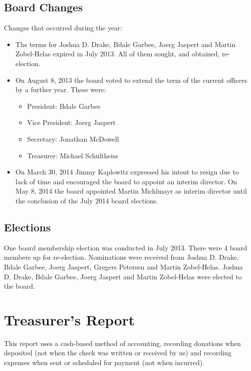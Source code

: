 \documentclass[letterpaper]{report}
\begin{document}
\section{Board Changes}

Changes that occurred during the year:

\begin{itemize}
\item The terms for Joshua D. Drake, Bdale Garbee, Joerg Jaspert and
Martin Zobel-Helas expired in July 2013. All of them sought, and
obtained, re-election.
\item On August 8, 2013 the board voted to extend the term of the current
officers by a further year. These were:
\begin{itemize}
\item President: Bdale Garbee
\item Vice President: Joerg Jaspert
\item Secretary: Jonathan McDowell
\item Treasurer: Michael Schultheiss
\end{itemize}
\item On March 30, 2014 Jimmy Kaplowitz expressed his intent to resign
due to lack of time and encouraged the board to appoint an interim
director.  On May 8, 2014 the board appointed Martin Michlmayr as
interim director until the conclusion of the July 2014 board elections.
\end{itemize}

\section{Elections}

One board membership election was conducted in July 2013. There were 4
board members up for re-election.  Nominations were received from Joshua D.
Drake, Bdale Garbee, Joerg Jaspert, Gregers Petersen and Martin
Zobel-Helas.  Joshua D. Drake, Bdale Garbee, Joerg Jaspert and Martin
Zobel-Helas were elected to the board.

\chapter{Treasurer's Report}

This report uses a cash-based method of accounting, recording donations when
deposited (not when the check was written or received by us) and recording
expenses when sent or scheduled for payment (not when incurred).
\end{document}
